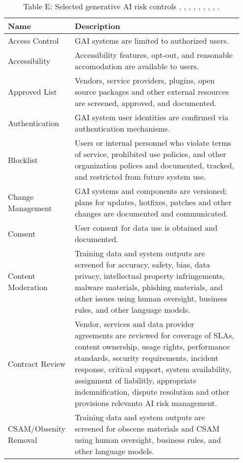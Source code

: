 \documentclass[fleqn]{article}
\begin{document}
\begin{table}[H]
	\caption*{Table E: Selected generative AI risk controls \cite{airmf}, \cite{playbook}, \cite{ai600-1}, \cite{iso42001}, \cite{mcgraw2024architectural}, \cite{mcgraw2020architectural}, \cite{msft_rai_std}, \cite{uk_ai_safety}, \cite{occ_mrm}. }
	\label{tab:controls}
	\footnotesize
	\begin{tabular}{|m{0.25\linewidth} |m{0.70\linewidth} |}
		\hline
		\textbf{Name} & \textbf{Description} \\
		\hline
		Access Control  & GAI systems are limited to authorized users.  \\ \hline
		Accessibility  & Accessibility features, opt-out, and reasonable accomodation are available to users. \\ \hline
		Approved List & Vendors, service providers, plugins, open source packages and other external resources are screened, approved, and documented.  \\ \hline
		Authentication  & GAI system user identities are confirmed via authentication mechanisms.  \\ \hline
		Blocklist  & Users or internal personnel who violate terms of service, prohibited use policies, and other organization polices and documented, tracked, and restricted from future system use.  \\ \hline		
		Change Management & GAI systems and components are versioned; plans for updates, hotfixes, patches and other changes are documented and communicated.   \\ \hline
		Consent & User consent for data use is obtained and documented.  \\ \hline
		Content Moderation & Training data and system outputs are screened for accuracy, safety, bias, data privacy, intellectual property infringements, malware materials, phishing materials, and other issues using human oversight, business rules, and other language models.   \\ \hline
		Contract Review & Vendor, services and data provider agreements are reviewed for coverage of SLAs, content ownership, usage rights, performance standards, security requirements, incident response, critical support, system availability, assignment of liabilitly, appropriate indemnification, dispute resolution and other provisions relevanto AI risk management.  \\ \hline		
		CSAM/Obsenity Removal  & Training data and system outputs are screened for obscene materials and CSAM using human oversight, business rules, and other language models.   \\ \hline		

\end{tabular}
\end{table}
\end{document}
